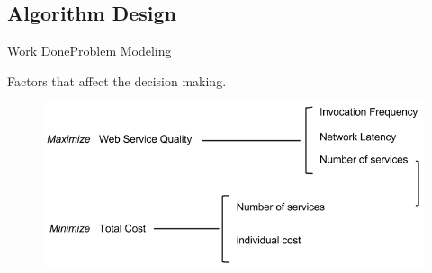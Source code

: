 \documentclass[10pt]{beamer}
\let\bbordermatrix\bordermatrix
\begin{document}
\subsection{Algorithm Design}
\begin{frame}{Work Done}{Problem Modeling}

Factors that affect the decision making.
\begin{figure}
	\includegraphics[width=\textwidth]{./Feathergraphics/factors.png}
\end{figure}




	



\end{frame}
\end{document}
